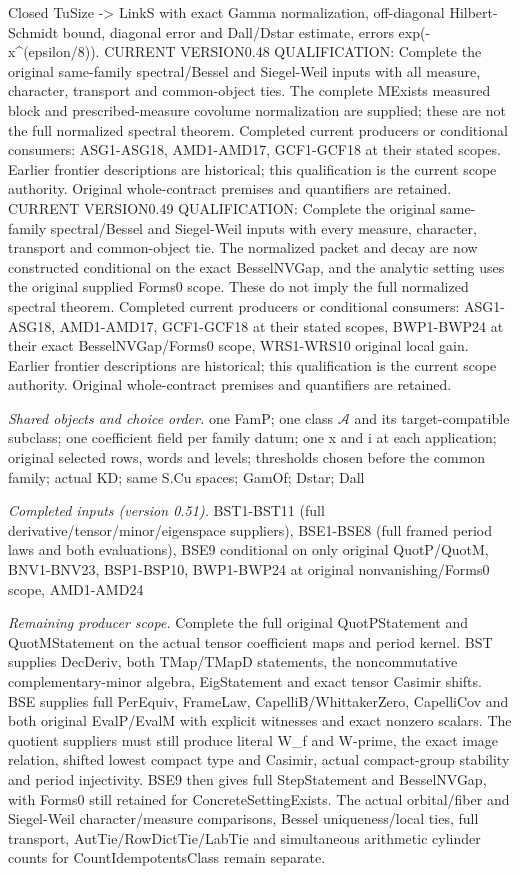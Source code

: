 Closed TuSize -> LinkS with exact Gamma normalization, off-diagonal Hilbert-Schmidt bound, diagonal error and Dall/Dstar estimate, errors exp(-x\textasciicircum{}(epsilon/8)). CURRENT VERSION0.48 QUALIFICATION: Complete the original same-family spectral/Bessel and Siegel-Weil inputs with all measure, character, transport and common-object ties. The complete MExists measured block and prescribed-measure covolume normalization are supplied; these are not the full normalized spectral theorem. Completed current producers or conditional consumers: ASG1-ASG18, AMD1-AMD17, GCF1-GCF18 at their stated scopes. Earlier frontier descriptions are historical; this qualification is the current scope authority. Original whole-contract premises and quantifiers are retained. CURRENT VERSION0.49 QUALIFICATION: Complete the original same-family spectral/Bessel and Siegel-Weil inputs with every measure, character, transport and common-object tie. The normalized packet and decay are now constructed conditional on the exact BesselNVGap, and the analytic setting uses the original supplied Forms0 scope. These do not imply the full normalized spectral theorem. Completed current producers or conditional consumers: ASG1-ASG18, AMD1-AMD17, GCF1-GCF18 at their stated scopes, BWP1-BWP24 at their exact BesselNVGap/Forms0 scope, WRS1-WRS10 original local gain. Earlier frontier descriptions are historical; this qualification is the current scope authority. Original whole-contract premises and quantifiers are retained.

\emph{Shared objects and choice order.} one FamP; one class $\mathcal A$ and its target-compatible subclass; one coefficient field per family datum; one x and i at each application; original selected rows, words and levels; thresholds chosen before the common family; actual KD; same S.Cu spaces; GamOf; Dstar; Dall

\emph{Completed inputs (version 0.51).} BST1-BST11 (full derivative/tensor/minor/eigenspace suppliers), BSE1-BSE8 (full framed period laws and both evaluations), BSE9 conditional on only original QuotP/QuotM, BNV1-BNV23, BSP1-BSP10, BWP1-BWP24 at original nonvanishing/Forms0 scope, AMD1-AMD24

\emph{Remaining producer scope.} Complete the full original QuotPStatement and QuotMStatement on the actual tensor coefficient maps and period kernel. BST supplies DecDeriv, both TMap/TMapD statements, the noncommutative complementary-minor algebra, EigStatement and exact tensor Casimir shifts. BSE supplies full PerEquiv, FrameLaw, CapelliB/WhittakerZero, CapelliCov and both original EvalP/EvalM with explicit witnesses and exact nonzero scalars. The quotient suppliers must still produce literal W\_\allowbreak f and W-prime, the exact image relation, shifted lowest compact type and Casimir, actual compact-group stability and period injectivity. BSE9 then gives full StepStatement and BesselNVGap, with Forms0 still retained for ConcreteSettingExists. The actual orbital/fiber and Siegel-Weil character/measure comparisons, Bessel uniqueness/local ties, full transport, AutTie/RowDictTie/LabTie and simultaneous arithmetic cylinder counts for CountIdempotentsClass remain separate.

